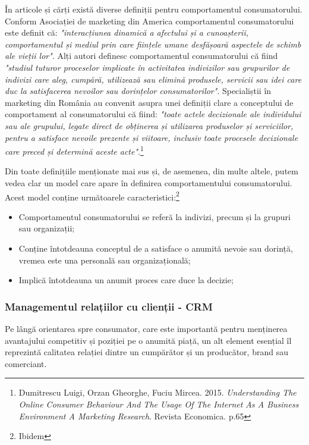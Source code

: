 \documentclass[a4paper, 12pt]{article}
\begin{document}
		\quad În articole și cărți există diverse definiții pentru comportamentul consumatorului. Conform Asociației de marketing din America comportamentul consumatorului este definit că: \textit{"interacțiunea dinamică a afectului și a cunoașterii, comportamentul și mediul prin care ființele umane desfășoară aspectele de schimb ale vieții lor"}. Alți autori definesc comportamentul consumatorului că fiind \textit{"studiul tuturor proceselor implicate în activitatea indivizilor sau grupurilor de indivizi care aleg, cumpără, utilizează sau elimină produsele, servicii sau idei care duc la satisfacerea nevoilor sau dorințelor consumatorilor"}. Specialiștii în marketing din România au convenit asupra unei definiții clare a conceptului de comportament al consumatorului că fiind: \textit{"toate actele decizionale ale individului sau ale grupului, legate direct de obținerea și utilizarea produselor și serviciilor, pentru a satisface nevoile prezente și viitoare, inclusiv toate procesele decizionale care preced și determină aceste acte"}.\footnote{Dumitrescu Luigi, Orzan Gheorghe, Fuciu Mircea. 2015. \textit{Understanding The Online Consumer Behaviour And The Usage Of The Internet As A Business Environment A Marketing Research}. Revista Economica. p.65} 
		
		\quad Din toate definițiile menționate mai sus și, de asemenea, din multe altele, putem vedea clar un model care apare în definirea comportamentului consumatorului. Acest model conține următoarele caracteristici:\footnote{Ibidem}

		\begin{itemize}
			\item Comportamentul consumatorului se referă la indivizi, precum și la grupuri sau
			organizații;
			\item Conține întotdeauna conceptul de a satisface o anumită nevoie sau dorință,
			vremea este una personală sau organizațională;
			\item Implică întotdeauna un anumit proces care duce la decizie;
		\end{itemize}
	
			\subsubsection{Managementul relațiilor cu clienții - CRM}
		\qquad Pe lângă orientarea spre consumator, care este importantă pentru menținerea avantajului competitiv și poziției pe o anumită piață, un alt element esențial îl reprezintă calitatea relației dintre un cumpărător și un producător, brand sau comerciant.
		
\end{document}
